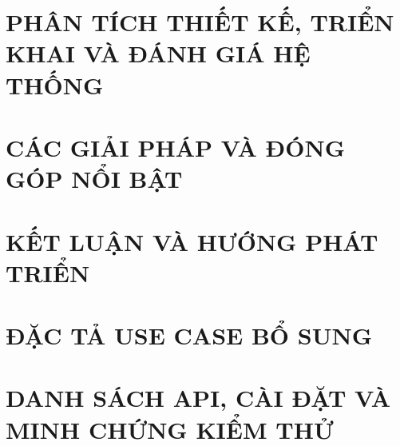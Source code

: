 \documentclass[a4paper,12pt,oneside]{report}
\theoremstyle{definition}
\begin{document}
\newpage
\chapter{PHÂN TÍCH THIẾT KẾ, TRIỂN KHAI VÀ ĐÁNH GIÁ HỆ THỐNG}
\label{chapter:Experiment}


\newpage
\chapter{CÁC GIẢI PHÁP VÀ ĐÓNG GÓP NỔI BẬT}
\label{chapter:SolutionAndContribution}

\newpage
\chapter{KẾT LUẬN VÀ HƯỚNG PHÁT TRIỂN} %
\label{chapter:conclusion}



\newpage
\renewcommand{\bibname}{TÀI LIỆU THAM KHẢO}


\appendices
\addappheadtotoc


{}
\titlespacing*{\chapter}{0pt}{-6pt}{14pt}

\chapter{ĐẶC TẢ USE CASE BỔ SUNG}
\label{appendix:usecase}

\newpage
\chapter{DANH SÁCH API, CÀI ĐẶT VÀ MINH CHỨNG KIỂM THỬ}
\label{appendix:api}

\end{document}

